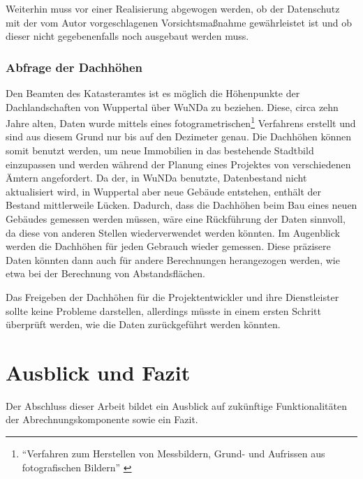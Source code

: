 Weiterhin muss vor einer Realisierung abgewogen werden, ob der Datenschutz mit der vom Autor vorgeschlagenen Vorsichtsmaßnahme gewährleistet ist und ob dieser nicht gegebenenfalls noch ausgebaut werden muss.

\subsection{Abfrage der Dachhöhen}
\label{subsec:dachhoehen}
Den Beamten des Katasteramtes ist es möglich die Höhenpunkte der Dachlandschaften von Wuppertal über \ac{WuNDa} zu beziehen.
Diese, circa zehn Jahre alten, Daten wurde mittels eines fotogrametrischen\footnote{\enquote{Verfahren zum Herstellen von Messbildern, Grund- und Aufrissen aus fotografischen Bildern} \autocite{duden-foto}}
Verfahrens erstellt und sind aus diesem Grund nur bis auf den Dezimeter genau.
Die Dachhöhen können somit benutzt werden, um neue Immobilien in das bestehende Stadtbild einzupassen und werden während der Planung eines Projektes von verschiedenen Ämtern angefordert.
Da der, in \ac{WuNDa} benutzte, Datenbestand nicht aktualisiert wird, in Wuppertal aber neue Gebäude entstehen, enthält der Bestand mittlerweile Lücken.
Dadurch, dass die Dachhöhen beim Bau eines neuen Gebäudes gemessen werden müssen, wäre eine Rückführung der Daten sinnvoll, da diese von anderen Stellen wiederverwendet werden könnten.
Im Augenblick werden die Dachhöhen für jeden Gebrauch wieder gemessen.
Diese präzisere Daten könnten dann auch für andere Berechnungen herangezogen werden, wie etwa bei der Berechnung von Abstandsflächen.

Das Freigeben der Dachhöhen für die Projektentwickler und ihre Dienstleister sollte keine Probleme darstellen, allerdings müsste in einem ersten Schritt überprüft werden, wie die Daten zurückgeführt werden könnten.

\chapter{Ausblick und Fazit}
Der Abschluss dieser Arbeit bildet ein Ausblick auf zukünftige Funktionalitäten der Abrechnungskomponente sowie ein Fazit.

